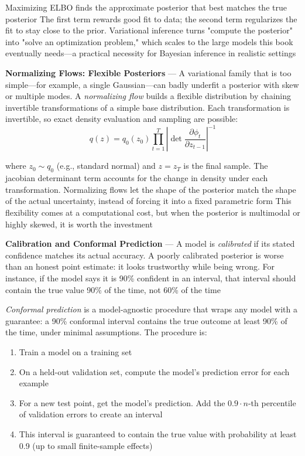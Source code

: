 Maximizing ELBO finds the approximate posterior that best matches the true posterior
The first term rewards good fit to data; the second term regularizes the fit to stay
close to the prior. Variational inference turns "compute the posterior" into "solve
an optimization problem," which scales to the large models this book eventually needs—a
practical necessity for Bayesian inference in realistic settings

\textbf{Normalizing Flows: Flexible Posteriors} --- A variational family that is
too simple—for example, a single Gaussian—can badly underfit a posterior with
skew or multiple modes. A \emph{normalizing flow} builds a flexible distribution
by chaining invertible transformations of a simple base distribution. Each transformation
is invertible, so exact density evaluation and sampling are possible:
\begin{equation}
  q(z) = q_{0}(z_{0}) \prod_{t=1}^{T}\left| \det \frac{\partial \phi_{t}}{\partial
  z_{t-1}}\right|^{-1}\label{eq:flow}
\end{equation}

where $z_{0}\sim q_{0}$ (e.g., standard normal) and $z = z_{T}$ is the final
sample. The jacobian determinant term accounts for the change in density under each
transformation. Normalizing flows let the shape of the posterior match the shape
of the actual uncertainty, instead of forcing it into a fixed parametric form This
flexibility comes at a computational cost, but when the posterior is multimodal
or highly skewed, it is worth the investment

\textbf{Calibration and Conformal Prediction} --- A model is \emph{calibrated}
if its stated confidence matches its actual accuracy. A poorly calibrated posterior
is worse than an honest point estimate: it looks trustworthy while being wrong. For
instance, if the model says it is 90\% confident in an interval, that interval
should contain the true value 90\% of the time, not 60\% of the time

\emph{Conformal prediction} is a model-agnostic procedure that wraps any model with
a guarantee: a 90\% conformal interval contains the true outcome at least 90\%
of the time, under minimal assumptions. The procedure is:

\begin{enumerate}
  \item Train a model on a training set

  \item On a held-out validation set, compute the model's prediction error for
    each example

  \item For a new test point, get the model's prediction. Add the $0.9 \cdot n$-th
    percentile of validation errors to create an interval

  \item This interval is guaranteed to contain the true value with probability at
    least 0.9 (up to small finite-sample effects)
\end{enumerate}

